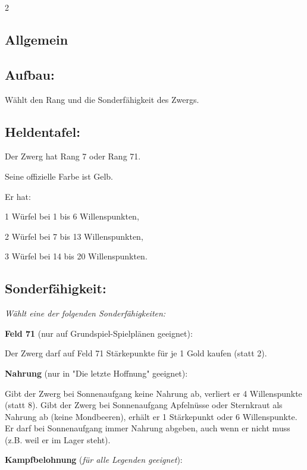 \documentclass[10pt, a4paper, oneside]{book}
\newcommand{\fan}[1]{\textit{#1}}
\begin{document}
\begin{multicols*}{2}\raggedcolumns


\begin{nobgcolor}

\section{Allgemein}


\subsection{Aufbau:}

Wählt den Rang und die Sonderfähigkeit des Zwergs.


\subsection{Heldentafel:}

Der Zwerg hat Rang 7 oder Rang 71.

Seine offizielle Farbe ist Gelb.

Er hat:

\bullet{} 1 Würfel bei 1 bis 6 Willenspunkten,

\bullet{} 2 Würfel bei 7 bis 13 Willenspunkten,

\bullet{} 3 Würfel bei 14 bis 20 Willenspunkten.



\subsection{Sonderfähigkeit:}

\fan{Wählt eine der folgenden Sonderfähigkeiten:}

\bullet{} \textbf{Feld 71} (nur auf Grundspiel-Spielplänen geeignet):

Der Zwerg darf auf Feld 71 Stärkepunkte für je 1 Gold kaufen (statt 2).

\bullet{} \textbf{Nahrung} (nur in "Die letzte Hoffnung" geeignet):

Gibt der Zwerg bei Sonnenaufgang keine Nahrung ab, verliert er 4 Willenspunkte (statt 8). Gibt der Zwerg bei Sonnenaufgang Apfelnüsse oder Sternkraut als Nahrung ab (keine Mondbeeren\supercite{mh-mondbeeren,mh-begleitheft}), erhält er 1 Stärkepunkt oder 6 Willenspunkte. Er darf bei Sonnenaufgang immer Nahrung abgeben, auch wenn er nicht muss (z.B. weil er im Lager steht).
\supercite{dlh15-k-4}

\bullet{} \textbf{Kampfbelohnung} (\fan{für alle Legenden geeignet}):


\end{nobgcolor}
\end{multicols*}
\end{document}
